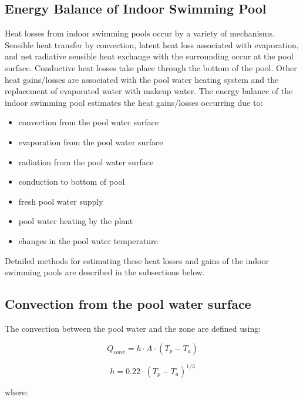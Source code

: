\subsection{Energy Balance of Indoor Swimming Pool}\label{energy-balance-of-indoor-swimming-pool}

Heat losses from indoor swimming pools occur by a variety of mechanisms. Sensible heat transfer by convection, latent heat loss associated with evaporation, and net radiative sensible heat exchange with the surrounding occur at the pool surface. Conductive heat losses take place through the bottom of the pool. Other heat gains/losses are associated with the pool water heating system and the replacement of evaporated water with makeup water. The energy balance of the indoor swimming pool estimates the heat gains/losses occurring due to:

\begin{itemize}
\tightlist
\item
  convection from the pool water surface
\item
  evaporation from the pool water surface
\item
  radiation from the pool water surface
\item
  conduction to bottom of pool
\item
  fresh pool water supply
\item
  pool water heating by the plant
\item
  changes in the pool water temperature
\end{itemize}

Detailed methods for estimating these heat losses and gains of the indoor swimming pools are described in the subsections below.

\subsection{Convection from the pool water surface}\label{convection-from-the-pool-water-surface}

The convection between the pool water and the zone are defined using:

\begin{equation}
Q_{conv} = h \cdot A \cdot (T_p - T_a)
\end{equation}

\begin{equation}
h = 0.22 \cdot (T_p - T_a)^{1/3}
\end{equation}

where:

